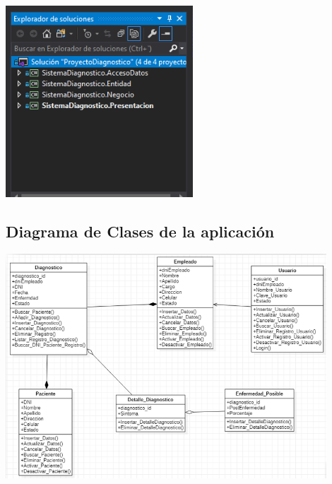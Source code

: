 \documentclass[preprint,12pt]{elsarticle}
\begin{document}
	\begin{center}
\includegraphics[width=7cm]{./imagen/4capas} 
	\end{center}
\subsection{\textbf{ Diagrama de Clases de la aplicación }}
\begin{center}
	\includegraphics[width=12cm]{./imagen/diagrmclasesvistaprocesos} 
	
	\end{center}
\end{document}
